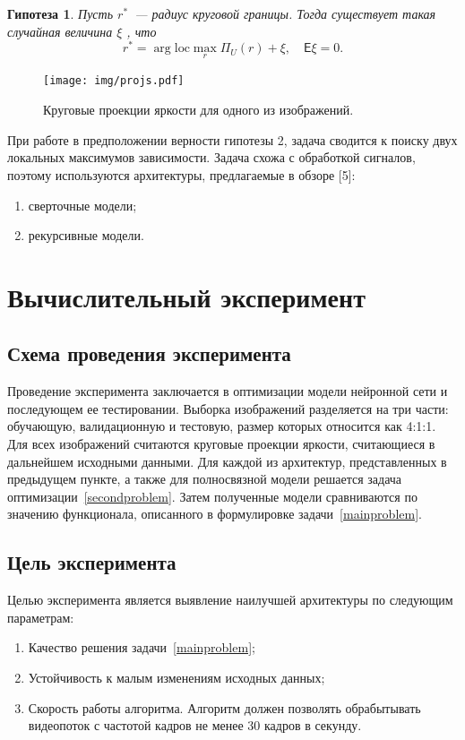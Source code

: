 \documentclass[12pt, twoside]{article}
\newtheorem{hop}{Гипотеза}
\begin{document}
\begin{hop}
Пусть $r^*$~--- радиус круговой границы. Тогда существует такая случайная величина $\xi$ , что
\[
 r^* = \arg \text{loc}\max\limits_{r}\Pi_U(r) + \xi, \quad \mathsf{E}\xi=0.
\]
\end{hop}

\begin{figure}[h]
	\centering
	\texttt{[image: img/projs.pdf]}
	\caption{Круговые проекции яркости для одного из изображений.}
	\label{fig:projs}
\end{figure}


При работе в предположении верности гипотезы 2, задача сводится к поиску двух локальных максимумов зависимости. Задача схожа с обработкой сигналов, поэтому используются архитектуры, предлагаемые в обзоре [5]:
\begin{enumerate}
	\item сверточные модели;
	\item рекурсивные модели.
\end{enumerate}


\section{Вычислительный эксперимент}

\subsection{Схема проведения эксперимента}

Проведение эксперимента заключается в оптимизации модели нейронной сети и последующем ее тестировании. Выборка изображений разделяется на три части: обучающую, валидационную и тестовую, размер которых относится как 4:1:1. Для всех изображений считаются круговые проекции яркости, считающиеся в дальнейшем исходными данными. Для каждой из архитектур, представленных в предыдущем пункте, а также для полносвязной модели решается задача оптимизации~\eqref{secondproblem}. Затем полученные модели сравниваются по значению функционала, описанного в формулировке задачи~\eqref{mainproblem}.

\subsection{Цель эксперимента}

Целью эксперимента является выявление наилучшей архитектуры по следующим параметрам:
\begin{enumerate}
	\item Качество решения задачи~\eqref{mainproblem};
	\item Устойчивость к малым изменениям исходных данных;
	\item Скорость работы алгоритма. Алгоритм должен позволять обрабытывать видеопоток с частотой кадров не менее 30 кадров в секунду.
\end{enumerate}
\end{document}
